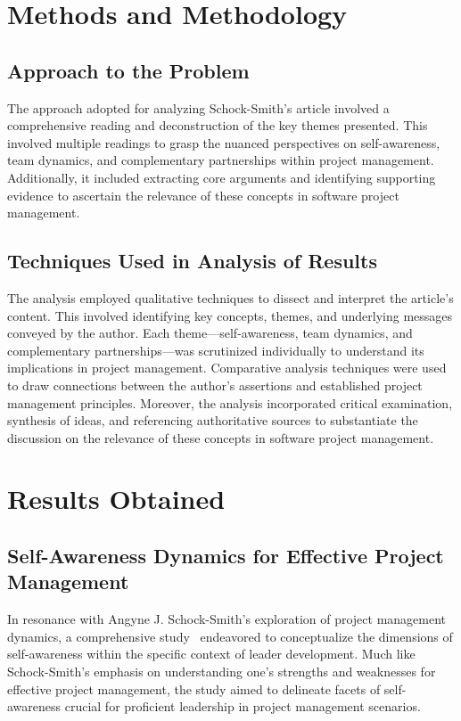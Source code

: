 \documentclass[runningheads]{llncs}
\begin{document}
\section{Methods and Methodology}

\subsection{Approach to the Problem}
The approach adopted for analyzing Schock-Smith's article involved a comprehensive reading and deconstruction of the key themes presented. This involved multiple readings to grasp the nuanced perspectives on self-awareness, team dynamics, and complementary partnerships within project management. Additionally, it included extracting core arguments and identifying supporting evidence to ascertain the relevance of these concepts in software project management.

\subsection{Techniques Used in Analysis of Results}
The analysis employed qualitative techniques to dissect and interpret the article's content. This involved identifying key concepts, themes, and underlying messages conveyed by the author. Each theme—self-awareness, team dynamics, and complementary partnerships—was scrutinized individually to understand its implications in project management. Comparative analysis techniques were used to draw connections between the author's assertions and established project management principles. Moreover, the analysis incorporated critical examination, synthesis of ideas, and referencing authoritative sources to substantiate the discussion on the relevance of these concepts in software project management.

\section{Results Obtained}
\subsection{Self-Awareness Dynamics for Effective Project Management}
In resonance with Angyne J. Schock-Smith's exploration of project management dynamics, a comprehensive study~\cite{ref_4} endeavored to conceptualize the dimensions of self-awareness within the specific context of leader development. Much like Schock-Smith's emphasis on understanding one's strengths and weaknesses for effective project management, the study aimed to delineate facets of self-awareness crucial for proficient leadership in project management scenarios.
\end{document}
